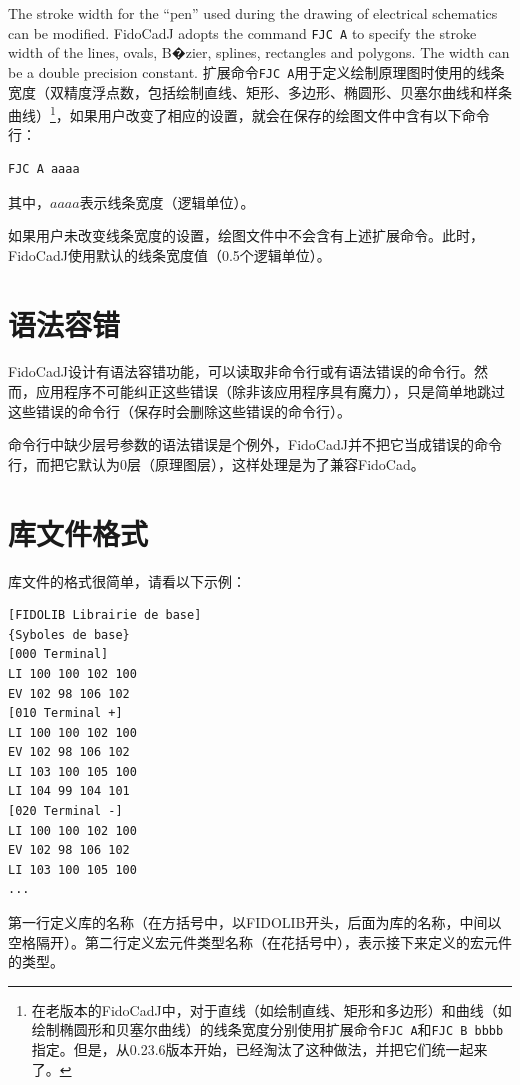 \documentclass[10pt,a4paper,twoside]{scrreprt}
\begin{document}
The stroke width for the ``pen'' used during the drawing of electrical schematics can be modified. FidoCadJ adopts the command \lstinline!FJC A! to specify the stroke width of the lines, ovals, B�zier, splines, rectangles and polygons. The width can be a double precision constant.
扩展命令\lstinline!FJC A!用于定义绘制原理图时使用的线条宽度（双精度浮点数，包括绘制直线、矩形、多边形、椭圆形、贝塞尔曲线和样条曲线）\footnote{在老版本的FidoCadJ中，对于直线（如绘制直线、矩形和多边形）和曲线（如绘制椭圆形和贝塞尔曲线）的线条宽度分别使用扩展命令\lstinline!FJC A!和\lstinline!FJC B bbbb!指定。但是，从0.23.6版本开始，已经淘汰了这种做法，并把它们统一起来了。}，如果用户改变了相应的设置，就会在保存的绘图文件中含有以下命令行：
\begin{lstlisting}
FJC A aaaa
\end{lstlisting}
其中，$aaaa$表示线条宽度（逻辑单位）。

如果用户未改变线条宽度的设置，绘图文件中不会含有上述扩展命令。此时，FidoCadJ使用默认的线条宽度值（0.5个逻辑单位）。

\section{语法容错}

FidoCadJ设计有语法容错功能，可以读取非命令行或有语法错误的命令行。然而，应用程序不可能纠正这些错误（除非该应用程序具有魔力），只是简单地跳过这些错误的命令行（保存时会删除这些错误的命令行）。

命令行中缺少层号参数的语法错误是个例外，FidoCadJ并不把它当成错误的命令行，而把它默认为0层（原理图层），这样处理是为了兼容FidoCad。

\section{库文件格式}

库文件的格式很简单，请看以下示例：

\begin{lstlisting} 
[FIDOLIB Librairie de base]
{Syboles de base}
[000 Terminal]
LI 100 100 102 100
EV 102 98 106 102
[010 Terminal +]
LI 100 100 102 100
EV 102 98 106 102
LI 103 100 105 100
LI 104 99 104 101
[020 Terminal -]
LI 100 100 102 100
EV 102 98 106 102
LI 103 100 105 100
...
\end{lstlisting} 
第一行定义库的名称（在方括号中，以FIDOLIB开头，后面为库的名称，中间以空格隔开）。第二行定义宏元件类型名称（在花括号中），表示接下来定义的宏元件的类型。
\end{document}
